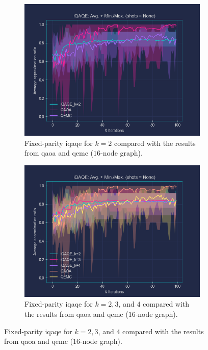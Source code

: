 \begin{figure}[ht!]
  \centering
  \begin{subfigure}[t]{0.495\textwidth}
      \centering
      \includegraphics[width=1\textwidth]{Figures/Chapter_5/Fixed-parity/k=2(16-node).png}
      \caption{Fixed-parity \acrshort{iqaqe} for $k=2$ compared with the results from \acrshort{qaoa} and \acrshort{qemc} ($16$-node graph).}
      \label{fig:Fixed-parity/k=2(16_node)}
  \end{subfigure}
  \hfill
  \begin{subfigure}[t]{0.495\textwidth}
      \centering
      \includegraphics[width=1\textwidth]{Figures/Chapter_5/Fixed-parity/k=2_3_4(16-node).png}
      \caption{Fixed-parity \acrshort{iqaqe} for $k=2, 3$, and $4$ compared with the results from \acrshort{qaoa} and \acrshort{qemc} ($16$-node graph).}
      \label{fig:Fixed-parity/k=2,3,4(16_node)}
  \end{subfigure}
\end{figure}

